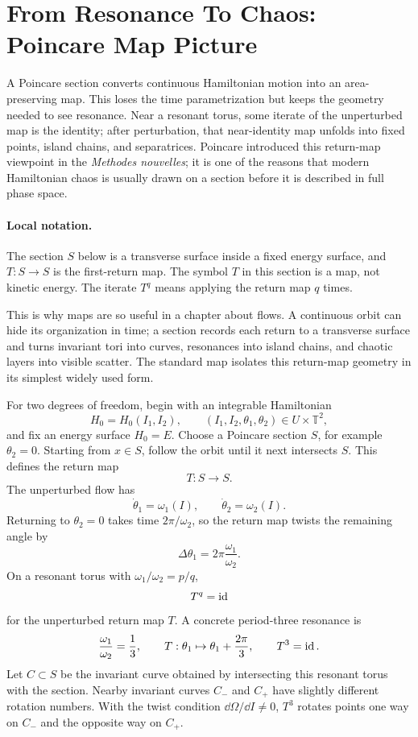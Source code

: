 \section{From Resonance To Chaos: Poincare Map Picture}
\label{sec:poincare-resonance-chaos}

A Poincare section converts continuous Hamiltonian motion into an
area-preserving map. This loses the time parametrization but keeps the geometry
needed to see resonance. Near a resonant torus, some iterate of the unperturbed
map is the identity; after perturbation, that near-identity map unfolds into
fixed points, island chains, and separatrices.
Poincare introduced this return-map viewpoint in the \emph{Methodes nouvelles};
it is one of the reasons that modern Hamiltonian chaos is usually drawn on a
section before it is described in full phase space.

\paragraph{Local notation.}
The section \(S\) below is a transverse surface inside a fixed energy surface,
and \(T:S\to S\) is the first-return map.  The symbol \(T\) in this section is
a map, not kinetic energy.  The iterate \(T^q\) means applying the return map
\(q\) times.

This is why maps are so useful in a chapter about flows. A continuous orbit can
hide its organization in time; a section records each return to a transverse
surface and turns invariant tori into curves, resonances into island chains,
and chaotic layers into visible scatter. The standard map isolates this
return-map geometry in its simplest widely used form.

For two degrees of freedom, begin with an integrable Hamiltonian
\[
  H_0=H_0(I_1,I_2),
  \qquad
  (I_1,I_2,\theta_1,\theta_2)\in U\times\mathbb T^2,
\]
and fix an energy surface \(H_0=E\). Choose a Poincare section \(S\), for
example \(\theta_2=0\). Starting from \(x\in S\), follow the orbit until it
next intersects \(S\). This defines the return map
\[
  T:S\to S.
\]
The unperturbed flow has
\[
  \dot\theta_1=\omega_1(I),
  \qquad
  \dot\theta_2=\omega_2(I).
\]
Returning to \(\theta_2=0\) takes time \(2\pi/\omega_2\), so the return map
twists the remaining angle by
\[
  \Delta\theta_1=2\pi\frac{\omega_1}{\omega_2}.
\]
On a resonant torus with \(\omega_1/\omega_2=p/q\),
\[
  T^q=\operatorname{id}
\]
for the unperturbed return map \(T\). A concrete period-three resonance is
\[
  \frac{\omega_1}{\omega_2}=\frac13,
  \qquad
  T:\theta_1\mapsto\theta_1+\frac{2\pi}{3},
  \qquad
  T^3=\operatorname{id}.
\]
Let \(C\subset S\) be the invariant curve obtained by intersecting this
resonant torus with the section. Nearby invariant curves \(C_-\) and \(C_+\)
have slightly different rotation numbers. With the twist condition
\(\dd\Omega/\dd I\neq0\), \(T^3\) rotates points one way on \(C_-\) and the
opposite way on \(C_+\).

